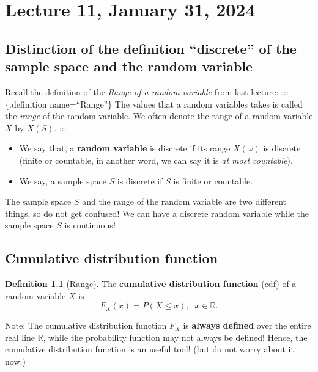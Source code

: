 \documentclass[
]{book}
\theoremstyle{definition}
\newtheorem{definition}{Definition}[chapter]
\theoremstyle{definition}
\theoremstyle{definition}
\theoremstyle{definition}
\theoremstyle{remark}
\begin{document}
\chapter{Lecture 11, January 31, 2024}\label{lecture-11-january-31-2024}

\section{Distinction of the definition ``discrete'' of the sample space and the random variable}\label{distinction-of-the-definition-discrete-of-the-sample-space-and-the-random-variable}

Recall the definition of the \emph{Range of a random variable} from last lecture:
::: \{.definition name=``Range''\}
The values that a random variables takes is called the \emph{range} of the random variable. We often denote the range of a random variable \(X\) by \(X(S)\).
:::

\begin{itemize}
\item
  We say that, a \textbf{random variable} is discrete if its range \(X(\omega)\) is discrete (finite or countable, in another word, we can say it is \emph{at most countable}).
\item
  We say, a sample space \(S\) is discrete if \(S\) is finite or countable.
\end{itemize}

The sample space \(S\) and the range of the random variable are two different things, so do not get confused! We can have a discrete random variable while the sample space \(S\) is continuous!

\section{Cumulative distribution function}\label{cumulative-distribution-function}

\begin{definition}[Range]
The \textbf{cumulative distribution function} (cdf) of a random variable \(X\) is
\[
F_X(x) = P(X \le x),\;\; x \in {\mathbb{R}}.
\]
\end{definition}

Note: The cumulative distribution function \(F_X\) is \textbf{always defined} over the entire real line \(\mathbb{R}\), while the probability function may not always be defined! Hence, the cumulative distribution function is an useful tool! (but do not worry about it now.)
\end{document}
